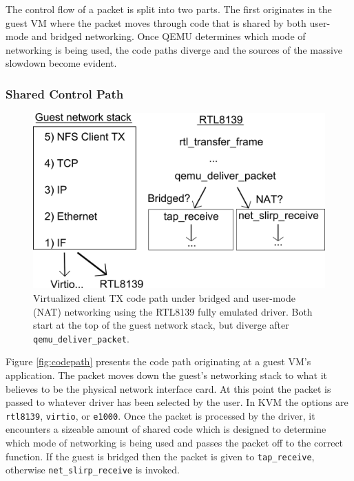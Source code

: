 The control flow of a packet is split into two parts.
The first originates in the guest VM where the packet moves through code that is shared by both user-mode and bridged networking.
Once QEMU determines which mode of networking is being used, the code paths diverge and the sources of the massive slowdown become evident.

\subsubsection{Shared Control Path}
\begin{figure}[!ht]
	\centering
		\includegraphics[scale=0.6]{codepath1}
	\caption{Virtualized client TX code path under bridged and user-mode (NAT) networking using the RTL8139 fully emulated driver. Both start at the top of the guest network stack, but diverge after \texttt{qemu\_deliver\_packet}.}
	\label{fig:codepath1}
\end{figure}

Figure \ref{fig:codepath} presents the code path originating at a guest VM's application.
The packet moves down the guest's networking stack to what it believes to be the physical network interface card.
At this point the packet is passed to whatever driver has been selected by the user.
In KVM the options are \texttt{rtl8139}, \texttt{virtio}, or \texttt{e1000}.
Once the packet is processed by the driver, it encounters a sizeable amount of shared code which is designed to determine which mode of networking is being used and passes the packet off to the
correct function.
If the guest is bridged then the packet is given to \texttt{tap\_receive}, otherwise \texttt{net\_slirp\_receive} is invoked.

